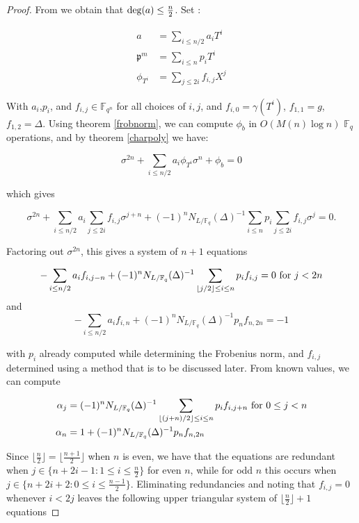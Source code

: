 \documentclass{acmart}
\theoremstyle{remark}
\numberwithin{equation}{section}
\begin{document}
\begin{proof}

From \cite{frobdist} we obtain that $\textnormal{deg}(a) \leq \frac{n}{2}$. Set :

\begin{align*}
a & = \sum_{i \leq n/2} a_i T^i \\
\mathfrak{p}^m & = \sum_{i \leq n} p_iT^i \\
\phi_{T^i} & = \sum_{j \leq 2i} f_{i,j} X^{j}
\end{align*}


\noindent With $a_i$,$p_i$, and $f_{i,j} \in \mathbb{F}_{q^n}$ for all choices of $i,j$, and $f_{i,0} = \gamma(T^i)$, $f_{1,1} = g$, $f_{1,2} = \Delta$. Using theorem \ref{frobnorm}, we can compute $\phi_b$ in $O(M(n)\log n)$ $\mathbb{F}_q$ operations, and by theorem \ref{charpoly} we have:

\[ \sigma^{2n} + \sum_{i \leq n/2} a_i \phi_{T^i}\sigma^n + \phi_b = 0  \]

\noindent which gives

\[ \sigma^{2n} + \sum_{i \leq n/2} a_i \sum_{j \leq 2i} f_{i,j}\sigma^{j+n} + (-1)^nN_{L/\mathbb{F}_q}(\Delta)^{-1}\sum_{i \leq n} p_i\sum_{j \leq 2i} f_{i,j} \sigma^{j} = 0.  \]

\noindent Factoring out $\sigma^{2n}$, this gives a system of $n+1$ equations

\[ - \sum_{i \leq n/2} a_i f_{i,j-n} + (-1)^n N_{L/\mathbb{F}_q}(\Delta)^{-1} \sum_{\lfloor j/2 \rfloor \leq i \leq n} p_i f_{i,j} = 0 \textnormal{ for } j < 2n \]
\noindent and
\[ - \sum_{i \leq n/2} a_i f_{i,n} + (-1)^n N_{L/\mathbb{F}_q}(\Delta)^{-1}  p_n f_{n,2n} = -1 \]

\noindent with $p_i$ already computed while determining the Frobenius norm, and $f_{i,j}$ determined using a method that is to be discussed later. From known values, we can compute

\begin{align*}
\alpha_j & = (-1)^nN_{L/\mathbb{F}_q}(\Delta)^{-1} \sum_{\lfloor (j+n)/2 \rfloor \leq i \leq n} p_i f_{i,j + n}\textnormal{ for } 0 \leq j < n \\
\alpha_{n} & = 1 + (-1)^nN_{L/\mathbb{F}_q}(\Delta)^{-1}  p_n f_{n,2n}
\end{align*}

Since $\lfloor \frac{n}{2} \rfloor = \lfloor \frac{n + 1}{2} \rfloor$ when $n$ is even, we have that the equations are redundant when $j \in \{n + 2i - 1 : 1 \leq i \leq \frac{n}{2} \}$ for even $n$, while for odd $n$ this occurs when $j \in \{n + 2i + 2 : 0 \leq i \leq \frac{n-1}{2}\}$. Eliminating redundancies and noting that $f_{i,j} = 0$ whenever $i < 2j$ leaves the following upper triangular system of $\lfloor\frac{n}{2}\rfloor + 1$ equations



\end{proof}
\end{document}
